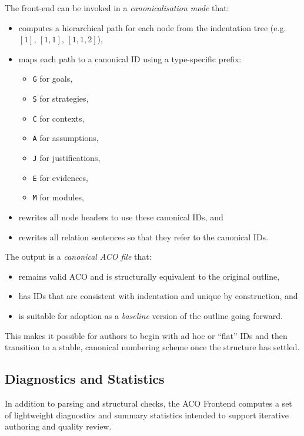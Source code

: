 \documentclass[11pt]{article}
\begin{document}
The front-end can be invoked in a \emph{canonicalisation mode} that:
\begin{itemize}[leftmargin=2em]
  \item computes a hierarchical path for each node from the indentation tree (e.g.\ \([1]\), \([1,1]\), \([1,1,2]\)),
  \item maps each path to a canonical ID using a type-specific prefix:
    \begin{itemize}[leftmargin=1.5em]
      \item \texttt{G} for goals,
      \item \texttt{S} for strategies,
      \item \texttt{C} for contexts,
      \item \texttt{A} for assumptions,
      \item \texttt{J} for justifications,
      \item \texttt{E} for evidences,
      \item \texttt{M} for modules,
    \end{itemize}
  \item rewrites all node headers to use these canonical IDs, and
  \item rewrites all relation sentences so that they refer to the canonical IDs.
\end{itemize}

The output is a \emph{canonical ACO file} that:
\begin{itemize}[leftmargin=2em]
  \item remains valid ACO and is structurally equivalent to the original outline,
  \item has IDs that are consistent with indentation and unique by construction, and
  \item is suitable for adoption as a \emph{baseline} version of the outline going forward.
\end{itemize}

This makes it possible for authors to begin with ad hoc or ``flat'' IDs and then transition to a stable, canonical numbering scheme once the structure has settled.

\subsection{Diagnostics and Statistics}
\label{sec:diagnostics}

In addition to parsing and structural checks, the ACO Frontend computes a set of
lightweight diagnostics and summary statistics intended to support iterative
authoring and quality review.
\end{document}

